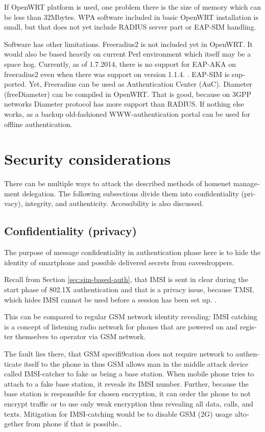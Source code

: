 \documentclass[12pt,a4paper,english]{tutthesis}
\begin{document}
\begin{otherlanguage}{english}
If OpenWRT platform is used, one problem there is the size of
memory which can be less than 32Mbytes.
WPA software included in basic OpenWRT installation is small,
but that does not yet include RADIUS server part or EAP-SIM handling.


Software has other limitations. Freeradius2 is not included yet in OpenWRT.
It would also be based heavily on current Perl environment which
itself may be a space hog. 
Currently, as of 1.7.2014, there is no support for EAP-AKA on
freeradius2 even when there was support on version 1.1.4. \cite{freeradius2}.
EAP-SIM is supported.
Yet, Freeradius can be used as Authentication Center (AuC).
Diameter (freeDiameter) can be compiled in OpenWRT. That is good,
because on 3GPP networks Diameter protocol has more support than RADIUS.
If nothing else works, as a backup old-fashioned WWW-authentication
portal can be used for offline authentication.


\section{Security considerations}
\label{sec-6-5}



There can be multiple ways to attack the described methods of
homenet management delegation. The following subsections divide them into
confidentiality (privacy), integrity, and
authenticity. Accessibility is also discussed.
\subsection{Confidentiality (privacy)}
\label{sec-6-5-1}
The purpose of message confidentiality in authentication phase here is
to hide the identity of smartphone and possible delivered secrets from
eavesdroppers. 

Recall from Section \ref{sec:sim-based-auth}, that IMSI is sent in clear 
during the start phase of 802.1X authentication and that is a privacy 
issue, because TMSI, which hides IMSI cannot be used before a session has been set up. \cite[p.66]{rfc4186}.

This can be compared to regular GSM network identity revealing: IMSI
catching is a concept of listening radio network for phones that are
powered on and register themselves to operator via GSM network.  

The
fault lies there, that GSM specifi9cation does not require network to
authenticate itself to the phone in thus GSM allows man in the middle
attack device called IMSI-catcher to fake as being a base station.
When mobile phone tries to attach to a fake base station, it reveals its
IMSI number. Further, because the base station is responsible for chosen
encryption, it can order the phone to not encrypt traffic or to use only
weak encryption thus revealing all data, calls, and
texts. Mitigation for IMSI-catching would be to
disable GSM (2G) usage altogether from phone if that is possible.\cite{imsi-heise}.


\end{otherlanguage}
\end{document}
